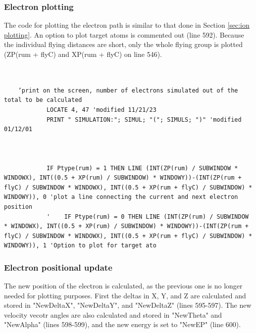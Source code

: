 \documentclass[10pt, reqno]{exam}
\begin{document}
\subsubsection{Electron plotting}

The code for plotting the electron path is similar to that done in Section \ref{sec:ion plotting}. An option to plot target atoms is commented out (line 592). Because the individual flying distances are short, only the whole flying group is plotted (ZP(rum + flyC) and XP(rum + flyC) on line 546). \par

\begin{verbatim}
    
    
    ‘print on the screen, number of electrons simulated out of the total to be calculated 
            LOCATE 4, 47 'modified 11/21/23
            PRINT " SIMULATION:"; SIMUL; "("; SIMULS; ")" 'modified 01/12/01
            
    
    
            IF Ptype(rum) = 1 THEN LINE (INT(ZP(rum) / SUBWINDOW * WINDOWX), INT((0.5 + XP(rum) / SUBWINDOW) * WINDOWY))-(INT(ZP(rum + flyC) / SUBWINDOW * WINDOWX), INT((0.5 + XP(rum + flyC) / SUBWINDOW) * WINDOWY)), 0 'plot a line connecting the current and next electron position
            '    IF Ptype(rum) = 0 THEN LINE (INT(ZP(rum) / SUBWINDOW * WINDOWX), INT((0.5 + XP(rum) / SUBWINDOW) * WINDOWY))-(INT(ZP(rum + flyC) / SUBWINDOW * WINDOWX), INT((0.5 + XP(rum + flyC) / SUBWINDOW) * WINDOWY)), 1 'Option to plot for target ato
\end{verbatim}

\subsubsection{Electron positional update}

The new position of the electron is calculated, as the previous one is no longer needed for plotting purposes. First the deltas in X, Y, and Z are calculated and stored in "NewDeltaX", "NewDeltaY", and "NewDeltaZ" (lines 595-597). The new velocity vecotr angles are also calculated and stored in "NewTheta" and "NewAlpha" (lines 598-599), and the new energy is set to "NewEP" (line 600). \par
\end{document}
